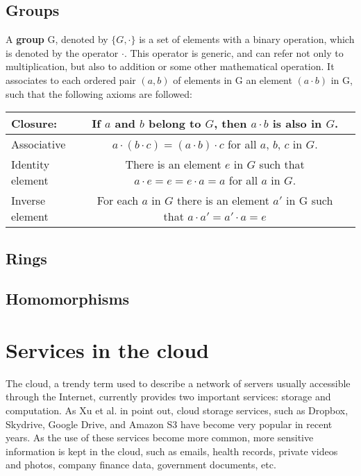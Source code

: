 \subsection{Groups}

A \textbf{group} G, denoted by $\{ G, \cdot \}$ is a set of elements with a binary operation, which is denoted by the operator $\cdot$. This operator is generic, and can refer not only to multiplication, but also to addition or some other mathematical operation. It associates to each ordered pair $(a, b)$ of elements in G an element $(a \cdot b)$ in G, such that the following axioms are followed:

\begin{tabular}{ l c r }
  \hline
  Closure: & If $a$ and $b$ belong to $G$, then $a \cdot b$ is also in $G$. \\ \hline
  Associative & $a \cdot (b \cdot c) = (a \cdot b) \cdot c $ for all $a$, $b$, $c$ in $G$. \\ \hline
  Identity element & There is an element $e$ in $G$ such that $a \cdot e = e = e \cdot a = a$ for all $a$ in $G$. \\ \hline
  Inverse element & For each $a$ in $G$ there is an element $a'$ in G such that $a \cdot a' = a' \cdot a = e$ \\ \hline
\end{tabular}
 
\subsection{Rings}

\subsection{Homomorphisms}

\section{Services in the cloud}

The cloud, a trendy term used to describe a network of servers usually accessible through the Internet, currently provides two important services: storage and computation. As Xu et al. in \cite{cryptoeprint:2011:574} point out, cloud storage services, such as Dropbox, Skydrive, Google Drive, and Amazon S3 have become very popular in recent years. As the use of these services become more common, more sensitive information is kept in the cloud, such as emails, health records, private videos and photos, company finance data, government documents, etc. 

